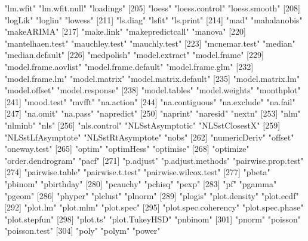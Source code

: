 \begin{Schunk}
\begin{Soutput}
[202] "lm.wfit"              "lm.wfit.null"         "loadings"            
[205] "loess"                "loess.control"        "loess.smooth"        
[208] "logLik"               "loglin"               "lowess"              
[211] "ls.diag"              "lsfit"                "ls.print"            
[214] "mad"                  "mahalanobis"          "makeARIMA"           
[217] "make.link"            "makepredictcall"      "manova"              
[220] "mantelhaen.test"      "mauchley.test"        "mauchly.test"        
[223] "mcnemar.test"         "median"               "median.default"      
[226] "medpolish"            "model.extract"        "model.frame"         
[229] "model.frame.aovlist"  "model.frame.default"  "model.frame.glm"     
[232] "model.frame.lm"       "model.matrix"         "model.matrix.default"
[235] "model.matrix.lm"      "model.offset"         "model.response"      
[238] "model.tables"         "model.weights"        "monthplot"           
[241] "mood.test"            "mvfft"                "na.action"           
[244] "na.contiguous"        "na.exclude"           "na.fail"             
[247] "na.omit"              "na.pass"              "napredict"           
[250] "naprint"              "naresid"              "nextn"               
[253] "nlm"                  "nlminb"               "nls"                 
[256] "nls.control"          "NLSstAsymptotic"      "NLSstClosestX"       
[259] "NLSstLfAsymptote"     "NLSstRtAsymptote"     "nobs"                
[262] "numericDeriv"         "offset"               "oneway.test"         
[265] "optim"                "optimHess"            "optimise"            
[268] "optimize"             "order.dendrogram"     "pacf"                
[271] "p.adjust"             "p.adjust.methods"     "pairwise.prop.test"  
[274] "pairwise.table"       "pairwise.t.test"      "pairwise.wilcox.test"
[277] "pbeta"                "pbinom"               "pbirthday"           
[280] "pcauchy"              "pchisq"               "pexp"                
[283] "pf"                   "pgamma"               "pgeom"               
[286] "phyper"               "plclust"              "plnorm"              
[289] "plogis"               "plot.density"         "plot.ecdf"           
[292] "plot.lm"              "plot.mlm"             "plot.spec"           
[295] "plot.spec.coherency"  "plot.spec.phase"      "plot.stepfun"        
[298] "plot.ts"              "plot.TukeyHSD"        "pnbinom"             
[301] "pnorm"                "poisson"              "poisson.test"        
[304] "poly"                 "polym"                "power"               

\end{Soutput}
\end{Schunk}

